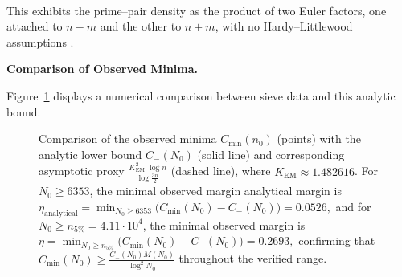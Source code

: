 \documentclass[11pt]{article}
\makeatletter
\theoremstyle{inline}
\theoremstyle{break}
\renewenvironment{proof}[1][\proofname]{%
  \par\pushQED{\qed}%
  \normalfont \topsep6\p@\@plus6\p@\relax
  \trivlist
  \item[\hskip\labelsep
        \itshape
    #1\@addpunct{.}]\mbox{}\\  %
}{%
  \popQED\endtrivlist\@endpefalse
}
\theoremstyle{break}
\theoremstyle{break}
\theoremstyle{break}
\theoremstyle{break}
\theoremstyle{break}
\theoremstyle{break}
\theoremstyle{inline}
\newcommand{\xMertens}{6353} %
\newcommand{\xNzeroStat}{71633} %
\newcommand{\xEtaStat}{0.2693} %
\newcommand{\xMinGlobal}{7219}       %
\newcommand{\xDeltaGlobal}{0.0526}   %
\newcommand{\tana}{{\scriptscriptstyle\mathrm{analytical}}}
\newcommand{\Cmeas}{C}              %
\newcommand{\Cminus}{\mathring{C}_{-}}   %
\newcommand{\CminusProduct}{C_{-}}
\newcommand{\CminusAsymp}{C_{-}^{\mathrm{asymp}}}
\newcommand{\Kem}{K_{\mathrm{EM}}}              %
\makeatother
\begin{document}
\begin{proof}
This exhibits the prime--pair density as the product of two Euler factors,
one attached to \(n-m\) and the other to \(n+m\), with no Hardy--Littlewood
assumptions \cite{HardyLittlewood1923,Vaughan1997}. 

\noindent\textbf{Comparison of Observed Minima.}

Figure~\ref{fig:lower-analytic-bound-comparison} displays
a numerical comparison between sieve data and this analytic bound.

\cpsdata

\begin{figure}[H]
\centering
{}
\caption{Comparison of the observed minima \( \Cmeas_{\min}(n_0) \) (points) with the analytic lower bound \( \CminusProduct(N_0) \) (solid line)
and corresponding asymptotic proxy \( \tfrac{\Kem^2\;\log{n}}{\log{\frac{3n}{2}}} \) (dashed line), where \( \Kem \approx 1.482616 \).
For \( N_0 \ge \xMertens \), the minimal observed margin analytical margin is
\(\displaystyle 
\eta_{\tana} = \min_{N_0 \ge \xMertens} \bigl( \Cmeas_{\min}(N_0) - \CminusProduct(N_0) ) = \xDeltaGlobal,
\)
and for \( N_0 \ge n_{5\%} = 4.11 \cdot 10^{4} \), the minimal observed margin is
\(\displaystyle 
\eta = \min_{N_0 \ge n_{5\%}} \bigl( \Cmeas_{\min}(N_0) - \CminusProduct(N_0) ) = \xEtaStat,
\)
confirming that \( \Cmeas_{\min}(N_0) \ge \tfrac{\CminusProduct(N_0) M(N_0)}{\log^2{N_0}} \) throughout the verified range.}
\label{fig:lower-analytic-bound-comparison}
\end{figure}



\end{proof}
\end{document}
